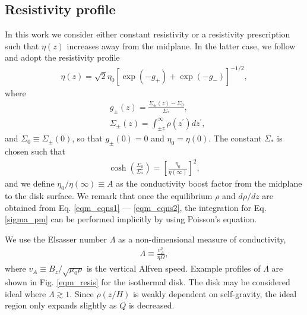 



\subsection{Resistivity profile}\label{resis_profile}
In this work we consider either constant resistivity or a
resistivity prescription such that $\eta(z)$ increases away from the
midplane. In the latter case, we follow \cite{fleming03} and adopt the
resistivity profile 
\begin{align}
  \eta(z) =
  \sqrt{2}\eta_0\left[\exp{\left(-g_+\right)}+\exp{\left(-g_-\right)}\right]^{-1/2},  
\end{align}
where
\begin{align}
  &g_\pm(z) =  \frac{\Sigma_\pm(z)-\Sigma_0}{\Sigma_*}, \\
  &\Sigma_\pm(z) = \int_{\pm z}^\infty\rho(z^\prime)dz^\prime, \label{sigma_pm}
\end{align}
and $\Sigma_0\equiv\Sigma_{\pm}(0)$, so that $g_\pm(0)=0$ and $\eta_0 
= \eta(0)$. The constant $\Sigma_*$ is chosen such that 
\begin{align}
  \cosh{\left(\frac{\Sigma_0}{\Sigma_*}\right)} =
  \left[\frac{\eta_0}{\eta(\infty)}\right]^2,
\end{align}
and we define $\eta_0/\eta(\infty)\equiv A$ as the conductivity
boost factor from the midplane to the disk surface. We remark that
once the equilibrium $\rho$ and $d\rho/dz$ are obtained from
Eq. \ref{eqm_eqns1} --- \ref{eqm_eqns2}, the integration for
Eq. \ref{sigma_pm} can be performed implicitly by using Poisson's 
equation. 


We use the Elsasser number $\Lambda$ as a non-dimensional measure of
conductivity,
\begin{align} 
  \Lambda \equiv \frac{v_A^2}{\eta\Omega},
\end{align}
where $v_A \equiv B_z/\sqrt{\mu_0\rho}$ is the vertical Alfven speed. Example
profiles of $\Lambda$ are shown in Fig. \ref{eqm_resis} for the
isothermal disk. The disk may be considered ideal where $\Lambda
\gtrsim 1$. Since $\hat{\rho}(z/H)$ is weakly dependent on  self-gravity, the
ideal region only expands slightly as $Q$ is decreased. 


